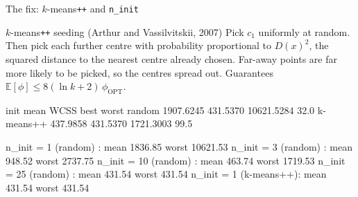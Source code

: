 \documentclass[aspectratio=169]{beamer}
\begin{document}
\begin{frame}[fragile,shrink=8]{The fix: $k$-means\texttt{++} and \texttt{n\_init}}
  \begin{block}{$k$-means\texttt{++} seeding (Arthur and Vassilvitskii, 2007)}
    \small Pick $c_1$ uniformly at random. Then pick each further centre with
    probability proportional to $D(x)^2$, the squared distance to the nearest
    centre already chosen. Far-away points are far more likely to be picked,
    so the centres spread out. Guarantees
    $\mathbb{E}[\phi] \le 8(\ln k + 2)\,\phi_{\text{OPT}}$.
  \end{block}
\begin{outblk}
  init         mean WCSS    best      worst   %
  random      1907.6245  431.5370 10621.5284      32.0
  k-means++    437.9858  431.5370  1721.3003      99.5

  n_init =  1 (random)   : mean 1836.85   worst 10621.53   %
  n_init =  3 (random)   : mean  948.52   worst  2737.75   %
  n_init = 10 (random)   : mean  463.74   worst  1719.53   %
  n_init = 25 (random)   : mean  431.54   worst   431.54   %
  n_init =  1 (k-means++): mean  431.54   worst   431.54   %
\end{outblk}
\end{frame}
\end{document}
